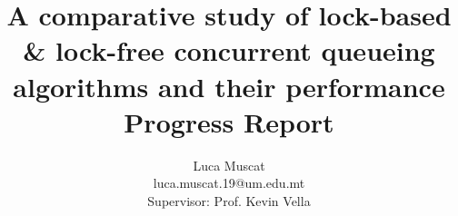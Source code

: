\documentclass[a4paper, 12pt, titlepage]{article}
\begin{document}
\title{A comparative study of lock-based & lock-free concurrent queueing algorithms and their performance \\ Progress Report}
\author{Luca Muscat \\ luca.muscat.19@um.edu.mt \\ Supervisor: Prof. Kevin Vella}

\titleformat{\section}{\Large\bfseries\filcenter}{}{0em}{}
\titleformat{\subsection}{\normalsize\bfseries\filcenter}{}{0em}{}
\titleformat{\subsubsection}{\small\bfseries}{}{0em}{}
\maketitle

\pagebreak
\tableofcontents
\pagebreak
\end{document}

